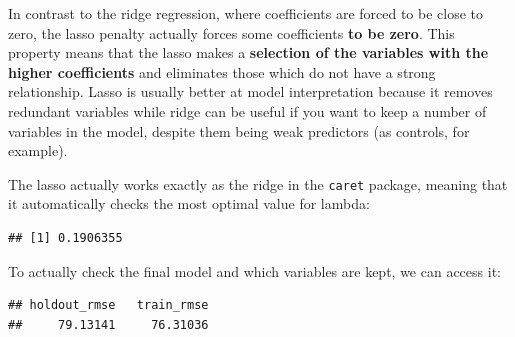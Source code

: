 \documentclass[
]{book}
\newenvironment{Shaded}{\begin{snugshade}}{\end{snugshade}}
\newcommand{\DataTypeTok}[1]{\textcolor[rgb]{0.13,0.29,0.53}{#1}}
\newcommand{\KeywordTok}[1]{\textcolor[rgb]{0.13,0.29,0.53}{\textbf{#1}}}
\newcommand{\NormalTok}[1]{#1}
\newcommand{\OperatorTok}[1]{\textcolor[rgb]{0.81,0.36,0.00}{\textbf{#1}}}
\newcommand{\StringTok}[1]{\textcolor[rgb]{0.31,0.60,0.02}{#1}}
\begin{document}
In contrast to the ridge regression, where coefficients are forced to be close to zero, the lasso penalty actually forces some coefficients \textbf{to be zero}. This property means that the lasso makes a \textbf{selection of the variables with the higher coefficients} and eliminates those which do not have a strong relationship. Lasso is usually better at model interpretation because it removes redundant variables while ridge can be useful if you want to keep a number of variables in the model, despite them being weak predictors (as controls, for example).

The lasso actually works exactly as the ridge in the \texttt{caret} package, meaning that it automatically checks the most optimal value for lambda:

\begin{Shaded}
\end{Shaded}

\begin{verbatim}
## [1] 0.1906355
\end{verbatim}

To actually check the final model and which variables are kept, we can access it:

\begin{Shaded}
\end{Shaded}

\begin{verbatim}
## holdout_rmse   train_rmse 
##     79.13141     76.31036
\end{verbatim}
\end{document}
